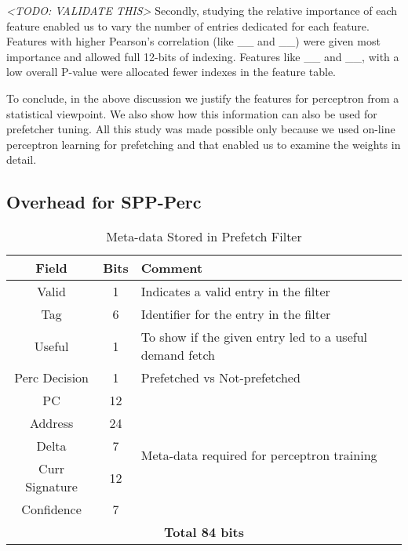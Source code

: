 \textit{<TODO: VALIDATE THIS>} Secondly, studying the relative
importance of each feature enabled us to vary the number of entries
dedicated for each feature.  Features with higher Pearson's
correlation (like \_\_ and \_\_) were given most importance and
allowed full 12-bits of indexing.  Features like \_\_ and \_\_, with a
low overall P-value were allocated fewer indexes in the feature table.

To conclude, in the above discussion we justify the features for
perceptron from a statistical viewpoint.  We also show how this
information can also be used for prefetcher tuning.  All this study
was made possible only because we used on-line perceptron learning for
prefetching and that enabled us to examine the weights in detail.


\subsection{Overhead for SPP-Perc}

\begin{table}[]
    \centering
    \begin{tabular}{|c|c|m{4.8cm}|}
    \hline
        \textbf{Field} &
        \textbf{Bits} &
        \textbf{Comment} \\
    \hline
         Valid & 1 & Indicates a valid entry in the filter\\
         Tag & 6 & Identifier for the entry in the filter\\
         Useful & 1 & To show if the given entry led to a useful demand fetch\\
         Perc Decision & 1 & Prefetched vs Not-prefetched \\
    \hline
        PC & 12 & \multirow{5}{4.8cm}{Meta-data required for perceptron training}\\
        Address & 24 & \\
        Delta & 7 & \\
        Curr Signature & 12 & \\
        Confidence & 7 & \\
    \hline
        \multicolumn{3}{|c|}{\textbf{Total 84 bits}}\\
    \hline
    \end{tabular}
    \caption{Meta-data Stored in Prefetch Filter}
    \label{tab:PF_metadata}
\end{table}

